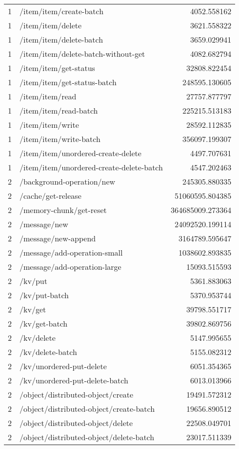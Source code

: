 \begin{longtable}{rlr}
1 & /item/item/create-batch & 4052.558162 \\
1 & /item/item/delete & 3621.558322 \\
1 & /item/item/delete-batch & 3659.029941 \\
1 & /item/item/delete-batch-without-get & 4082.682794 \\
1 & /item/item/get-status & 32808.822454 \\
1 & /item/item/get-status-batch & 248595.130605 \\
1 & /item/item/read & 27757.877797 \\
1 & /item/item/read-batch & 225215.513183 \\
1 & /item/item/write & 28592.112835 \\
1 & /item/item/write-batch & 356097.199307 \\
1 & /item/item/unordered-create-delete & 4497.707631 \\
1 & /item/item/unordered-create-delete-batch & 4547.202463 \\
2 & /background-operation/new & 245305.880335 \\
2 & /cache/get-release & 51060595.804385 \\
2 & /memory-chunk/get-reset & 364685009.273364 \\
2 & /message/new & 24092520.199114 \\
2 & /message/new-append & 3164789.595647 \\
2 & /message/add-operation-small & 1038602.893835 \\
2 & /message/add-operation-large & 15093.515593 \\
2 & /kv/put & 5361.883063 \\
2 & /kv/put-batch & 5370.953744 \\
2 & /kv/get & 39798.551717 \\
2 & /kv/get-batch & 39802.869756 \\
2 & /kv/delete & 5147.995655 \\
2 & /kv/delete-batch & 5155.082312 \\
2 & /kv/unordered-put-delete & 6051.354365 \\
2 & /kv/unordered-put-delete-batch & 6013.013966 \\
2 & /object/distributed-object/create & 19491.572312 \\
2 & /object/distributed-object/create-batch & 19656.890512 \\
2 & /object/distributed-object/delete & 22508.049701 \\
2 & /object/distributed-object/delete-batch & 23017.511339 \\

\end{longtable}
